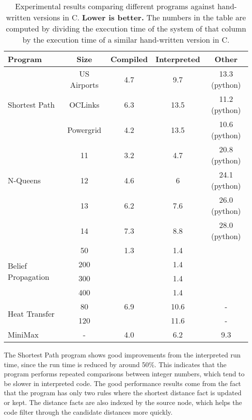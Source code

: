 \begin{table}[ht]
\begin{center}
    \begin{tabular}{ | l | c | c | c | c |}
    \hline
    \textbf{Program} & \textbf{Size} & \textbf{Compiled} & \textbf{Interpreted}
    & \textbf{Other} \\ \hline \hline
    \multirow{3}{*}{Shortest Path} & US Airports & 4.7 & 9.7 & 13.3 (python) \\
    & OCLinks & 6.3 & 13.5 & 11.2 (python) \\
    & Powergrid & 4.2 & 13.5 & 10.6 (python) \\ \hline \hline
    \multirow{3}{*}{N-Queens} & 11 & 3.2 & 4.7 & 20.8 (python) \\
    & 12 & 4.6 & 6 & 24.1 (python) \\
    & 13 & 6.2 & 7.6 & 26.0 (python) \\
    & 14 & 7.3 & 8.8 & 28.0 (python) \\ \hline \hline
    \multirow{4}{*}{Belief Propagation} & 50 & 1.3 & 1.4 & \\
    & 200 & & 1.4 & \\ 
    & 300 & & 1.4 & \\
    & 400 & & 1.4 & \\ \hline \hline
    \multirow{2}{*}{Heat Transfer} & 80 & 6.9 & 10.6 & - \\
    & 120 & & 11.6 & - \\ \hline \hline
    MiniMax & - & 4.0 & 6.2 & 9.3 \\ \hline \hline
    \end{tabular}
\end{center}
\caption{Experimental results comparing different programs against hand-written
   versions in C. \textbf{Lower is better.} The numbers in the table are computed by dividing the
   execution time of the system of that column by the execution time of a
   similar hand-written version in C.}
\label{fig:table_results}
\end{table}

The Shortest Path program shows good improvements from the interpreted run
time, since the run time is reduced by around 50\%. This indicates that the
program performs repeated comparisons between integer numbers, which tend to be
slower in interpreted code. The good performance results come from the fact that
the program has only two rules where the shortest distance fact is updated or
kept. The distance facts are also indexed by the source node, which helps the
code filter through the candidate distances more quickly.

